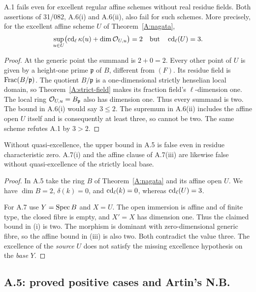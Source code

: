 \begin{corollary}
\label{A:nagata-global-consequences}
A.1 fails even for excellent regular affine schemes without real residue fields. Both assertions of 31/082, A.6(i) and A.6(ii), also fail for such schemes. More precisely, for the excellent affine scheme $U$ of Theorem~\ref{A:nagata},
\[
\sup_{u\in U}\bigl(\operatorname{cd}_\ell\kappa(u)+\dim\mathcal O_{U,u}\bigr)=2
\quad\text{but}\quad \operatorname{cd}_\ell(U)=3.
\]
\end{corollary}
\begin{proof}
At the generic point the summand is $2+0=2$. Every other point of $U$ is given by a height-one prime $\mathfrak p$ of $B$, different from $(F)$. Its residue field is $\operatorname{Frac}(B/\mathfrak p)$. The quotient $B/\mathfrak p$ is a one-dimensional strictly henselian local domain, so Theorem~\ref{A:strict-field} makes its fraction field's $\ell$-dimension one. The local ring $\mathcal O_{U,u}=B_{\mathfrak p}$ also has dimension one. Thus every summand is two. The bound in A.6(i) would say $3\leq2$. The supremum in A.6(ii) includes the affine open $U$ itself and is consequently at least three, so cannot be two. The same scheme refutes A.1 by $3>2$.
\end{proof}

\begin{corollary}
\label{A:nagata-local-consequences}
Without quasi-excellence, the upper bound in A.5 is false even in residue characteristic zero. A.7(i) and the affine clause of A.7(iii) are likewise false without quasi-excellence of the strictly local base.
\end{corollary}
\begin{proof}
In A.5 take the ring $B$ of Theorem~\ref{A:nagata} and its affine open $U$. We have $\dim B=2$, $\delta(k)=0$, and $\operatorname{cd}_\ell(k)=0$, whereas $\operatorname{cd}_\ell(U)=3$.

For A.7 use $Y=\operatorname{Spec} B$ and $X=U$. The open immersion is affine and of finite type, the closed fibre is empty, and $X'=X$ has dimension one. Thus the claimed bound in (i) is two. The morphism is dominant with zero-dimensional generic fibre, so the affine bound in (iii) is also two. Both contradict the value three. The excellence of the \emph{source} $U$ does not satisfy the missing excellence hypothesis on the \emph{base} $Y$.
\end{proof}

\subsection{A.5: proved positive cases and Artin's N.B.}

